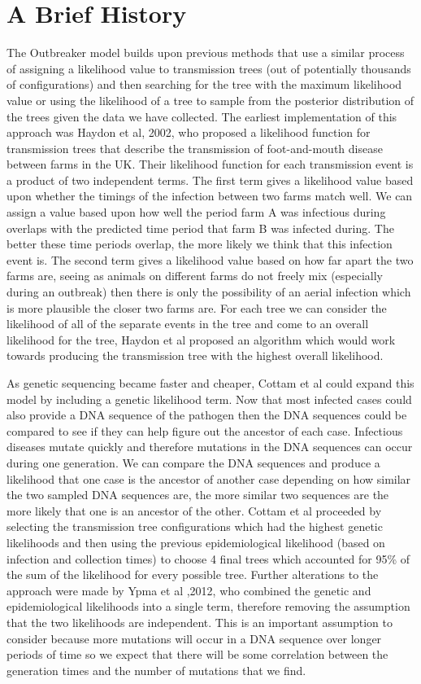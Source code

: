 \documentclass{amsbook}
\begin{document}
\section{A Brief History}
The Outbreaker model builds upon previous methods that use a similar process of assigning a likelihood value to transmission trees (out of potentially thousands of configurations) and then searching for the tree with the maximum likelihood value or using the likelihood of a tree to sample from the posterior distribution of the trees given the data we have collected. The earliest implementation of this approach was Haydon et al, 2002, who proposed a likelihood function for transmission trees that describe the transmission of foot-and-mouth disease between farms in the UK. Their likelihood function for each transmission event is a product of two independent terms. The first term gives a likelihood value based upon whether the timings of the infection between two farms match well. We can assign a value based upon how well the period farm A was infectious during overlaps with the predicted time period that farm B was infected during. The better these time periods overlap, the more likely we think that this infection event is. The second term gives a likelihood value based on how far apart the two farms are, seeing as animals on different farms do not freely mix (especially during an outbreak) then there is only the possibility of an aerial infection which is more plausible the closer two farms are. For each tree we can consider the likelihood of all of the separate events in the tree and come to an overall likelihood for the tree, Haydon et al proposed an algorithm which would work towards producing the transmission tree with the highest overall likelihood.

As genetic sequencing became faster and cheaper, Cottam et al could expand this model by including a genetic likelihood term. Now that most infected cases could also provide a DNA sequence of the pathogen then the DNA sequences could be compared to see if they can help figure out the ancestor of each case. Infectious diseases mutate quickly and therefore mutations in the DNA sequences can occur during one generation. We can compare the DNA sequences and produce a likelihood that one case is the ancestor of another case depending on how similar the two sampled DNA sequences are, the more similar two sequences are the more likely that one is an ancestor of the other. Cottam et al proceeded by selecting the transmission tree configurations which had the highest genetic likelihoods and then using the previous epidemiological likelihood (based on infection and collection times) to choose 4 final trees which accounted for 95\% of the sum of the likelihood for every possible tree. Further alterations to the approach were made by Ypma et al ,2012, who combined the genetic and epidemiological likelihoods into a single term, therefore removing the assumption that the two likelihoods are independent. This is an important assumption to consider because more mutations will occur in a DNA sequence over longer periods of time so we expect that there will be some correlation between the generation times and the number of mutations that we find.
\end{document}
